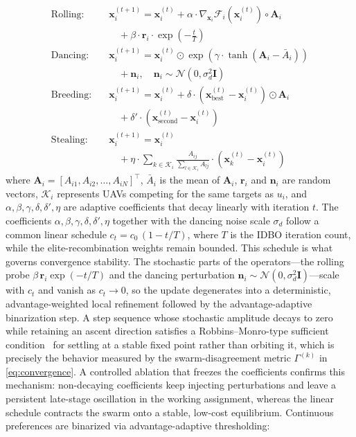 \documentclass[lettersize,journal]{IEEEtran}
\newcommand{\hladd}[1]{{\color{blue}#1}}
\begin{document}
\begin{align}
\text{Rolling:} \quad & \mathbf{x}_i^{(t+1)} = \mathbf{x}_i^{(t)} + \alpha \cdot \nabla_{\mathbf{x}_i} \mathcal{F}_i(\mathbf{x}_i^{(t)}) \circ \mathbf{A}_i \nonumber \\
& \quad + \beta \cdot \mathbf{r}_i \cdot \exp\left(-\frac{t}{T}\right) \label{eq:rolling_update} \\
\text{Dancing:} \quad & \mathbf{x}_i^{(t+1)} = \mathbf{x}_i^{(t)} \odot \exp\left(\gamma \cdot \tanh(\mathbf{A}_i - \bar{A}_i)\right) \nonumber \\
& \quad + \mathbf{n}_i, \quad \mathbf{n}_i \sim \mathcal{N}(0, \sigma_d^2 \mathbf{I}) \label{eq:dancing_update} \\
\text{Breeding:} \quad & \mathbf{x}_i^{(t+1)} = \mathbf{x}_i^{(t)} + \delta \cdot \left(\mathbf{x}_{\text{best}}^{(t)} - \mathbf{x}_i^{(t)}\right) \odot \mathbf{A}_i \nonumber \\
& \quad + \delta' \cdot \left(\mathbf{x}_{\text{second}}^{(t)} - \mathbf{x}_i^{(t)}\right) \label{eq:breeding_update} \\
\text{Stealing:} \quad & \mathbf{x}_i^{(t+1)} = \mathbf{x}_i^{(t)} \nonumber \\
& \quad + \eta \cdot \sum_{k \in \mathcal{K}_i} \frac{A_{ij}}{\sum_{l \in \mathcal{K}_i} A_{lj}} \cdot \left(\mathbf{x}_k^{(t)} - \mathbf{x}_i^{(t)}\right) \label{eq:stealing_update}
\end{align}
where $\mathbf{A}_i = [A_{i1}, A_{i2}, \dots, A_{iN}]^\top$, $\bar{A}_i$ is the mean of $\mathbf{A}_i$, $\mathbf{r}_i$ and $\mathbf{n}_i$ are random vectors, $\mathcal{K}_i$ represents UAVs competing for the same targets as $u_i$, and $\alpha, \beta, \gamma, \delta, \delta', \eta$ are adaptive coefficients that decay linearly with iteration $t$. \hladd{The coefficients $\alpha,\beta,\gamma,\delta,\delta',\eta$ together with the dancing noise scale $\sigma_d$ follow a common linear schedule $c_t=c_0\,(1-t/T)$, where $T$ is the IDBO iteration count, while the elite-recombination weights remain bounded. This schedule is what governs convergence stability. The stochastic parts of the operators---the rolling probe $\beta\,\mathbf{r}_i\exp(-t/T)$ and the dancing perturbation $\mathbf{n}_i\sim\mathcal{N}(0,\sigma_d^2\mathbf{I})$---scale with $c_t$ and vanish as $c_t\!\to\!0$, so the update degenerates into a deterministic, advantage-weighted local refinement followed by the advantage-adaptive binarization step. A step sequence whose stochastic amplitude decays to zero while retaining an ascent direction satisfies a Robbins--Monro-type sufficient condition~\cite{robbins1951stochastic} for settling at a stable fixed point rather than orbiting it, which is precisely the behavior measured by the swarm-disagreement metric $\Gamma^{(k)}$ in \eqref{eq:convergence}. A controlled ablation that freezes the coefficients confirms this mechanism: non-decaying coefficients keep injecting perturbations and leave a persistent late-stage oscillation in the working assignment, whereas the linear schedule contracts the swarm onto a stable, low-cost equilibrium.} Continuous preferences are binarized via advantage-adaptive thresholding:
\end{document}

